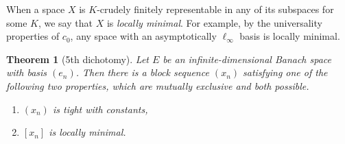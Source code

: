 \documentclass[10pt]{amsart}
\numberwithin{equation}{section}
\newtheorem{thm}{Theorem}[section]
\begin{document}
When a space $X$ is $K$-crudely finitely representable in any of its subspaces
for some $K$, we say that $X$ is {\em locally minimal}. For example, by the
universality properties of $c_0$, any space
with an asymptotically $\ell_{\infty}$ basis is locally minimal.

\begin{thm}[5th dichotomy]\label{5th}
Let $E$ be an infinite-dimensional Banach space with basis $(e_n)$. Then there
is a block sequence $(x_n)$ satisfying one of the following two properties,
which are mutually exclusive and both possible.
\begin{enumerate}
 \item $(x_n)$ is tight with constants,
  \item $[x_n]$ is locally minimal.
\end{enumerate}
\end{thm}
\end{document}
